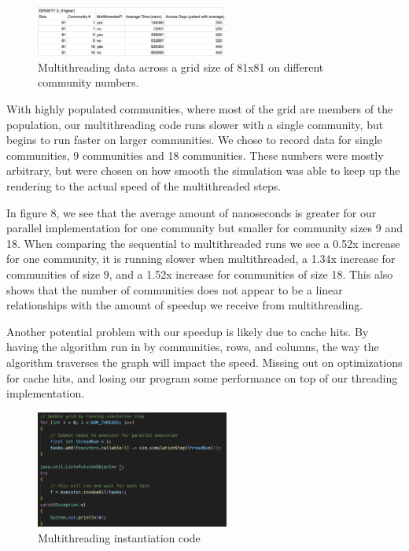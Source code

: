 \documentclass[conference]{IEEEtran}
\begin{document}
\begin{figure}[!hbt]
\centering
\includegraphics[width=2.5in]{Figures/High Denisty Evaluation (without extra speedup data).png}
\caption{Multithreading data across a grid size of 81x81 on different community numbers.}
\label{fig_sim}
\end{figure}

With highly populated communities, where most of the grid are members of the population, our multithreading code runs slower with a single community, but begins to run faster on larger communities. We chose to record data for single communities, 9 communities and 18 communities. These numbers were mostly arbitrary, but were chosen on how smooth the simulation was able to keep up the rendering to the actual speed of the multithreaded steps.

In figure 8, we see that the average amount of nanoseconds is greater for our parallel implementation for one community but smaller for community sizes 9 and 18. When comparing the sequential to multithreaded runs we see a 0.52x increase for one community, it is running slower when multithreaded, a 1.34x increase for communities of size 9, and a 1.52x increase for communities of size 18. This also shows that the number of communities does not appear to be a linear relationships with the amount of speedup we receive from multithreading.

Another potential problem with our speedup is likely due to cache hits. By having the algorithm run in by communities, rows, and columns, the way the algorithm traverses the graph will impact the speed. Missing out on optimizations for cache hits, and losing our program some performance on top of our threading implementation.

\begin{figure}[!hbt]
\centering
\includegraphics[width=2.5in]{Figures/multithreading set up.png}
\caption{Multithreading instantiation code}
\label{fig_sim}
\end{figure}
\end{document}
